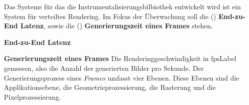 Das Systems für das die Instrumentalisierungsbilbiothek entwickelt wird ist ein System für verteiltes Rendering. Im Fokus der Überwachung soll die () \textbf{End-zu-End Latenz}, sowie die () \textbf{Generierungszeit eines Frames} stehen.

\textbf{End-zu-End Latenz} \space\space\space

\textbf{Generierungszeit eines Frames} \space\space\space
Die Renderinggeschwindigkeit in \gls{fpsLabel} gemessen, also die Anzahl der generierten Bilder pro Sekunde. Der Generierungsprozess eines \emph{Frames} umfasst vier Ebenen. Diese Ebenen sind die Applikationsebene, die Geometrieprozessierung, die Rasterung und die Pixelprozessierung.

